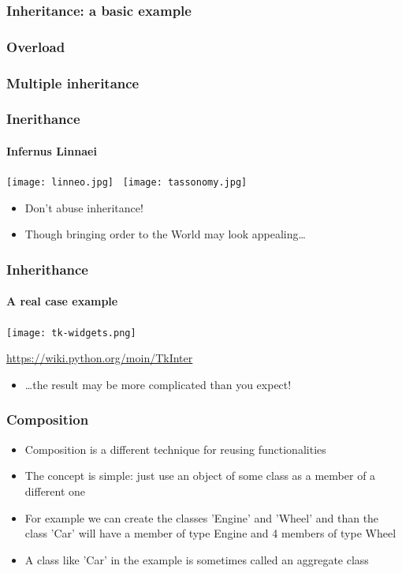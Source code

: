 \documentclass[9pt]{beamer}
\begin{document}
\begin{frame}
  \frametitle{Inheritance: a basic example}
  
\end{frame}


\begin{frame}
  \frametitle{Overload}
  
\end{frame}


\begin{frame}
  \frametitle{Multiple inheritance}
  
\end{frame}


\begin{frame}
  \frametitle{Inerithance}
  \framesubtitle{Infernus Linnaei}

  \centering
  \texttt{[image: linneo.jpg]}~\quad%
  \texttt{[image: tassonomy.jpg]}

  \bigskip

  \begin{itemize}
    \item Don't abuse inheritance!
    \medskip
    \item Though bringing order to the World may look appealing\dots
  \end{itemize}

\end{frame}


\begin{frame}
  \frametitle{Inherithance}
  \framesubtitle{A real case example}

  \centering
  \texttt{[image: tk-widgets.png]}

  \tiny \url{https://wiki.python.org/moin/TkInter} \normalsize

  \smallskip
  \begin{itemize}
    \item {\dots}the result may be more complicated than you expect!
  \end{itemize}
\end{frame}


\begin{frame}
  \frametitle{Composition}

  \begin{itemize}
    \item \alert{Composition} is a different technique for reusing functionalities
    \medskip
    \item The concept is simple: just use an object of some class as a member of
          a different one
    \medskip
    \item For example we can create the classes 'Engine' and 'Wheel' and than
          the class 'Car' will have a member of type Engine and 4 members of
          type Wheel
    \medskip
    \item A class like 'Car' in the example is sometimes called an
          \alert{aggregate} class
  \end{itemize}

\end{frame}
\end{document}
